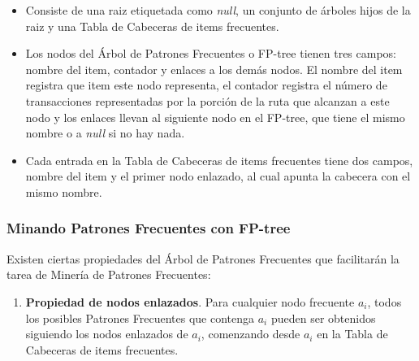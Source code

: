 \begin{itemize}
\item Consiste de una raiz etiquetada como \textit{null}, un conjunto de \'arboles hijos de la raiz y una Tabla de
Cabeceras de items frecuentes.
\item Los nodos del \'Arbol de Patrones Frecuentes o FP-tree tienen tres campos: nombre del item, contador y
enlaces a los dem\'as nodos. El nombre del item registra que item este nodo representa, el contador registra el
n\'umero de transacciones representadas por la porci\'on de la ruta que alcanzan a este nodo y los enlaces llevan
al siguiente nodo en el FP-tree, que tiene el mismo nombre o a \textit{null} si no hay nada.
\item Cada entrada en la Tabla de Cabeceras de items frecuentes tiene dos campos, nombre del item y el primer
nodo enlazado, al cual apunta la cabecera con el mismo nombre.
\end{itemize}

\subsubsection{Minando Patrones Frecuentes con FP-tree}
Existen ciertas propiedades del \'Arbol de Patrones Frecuentes que facilitar\'an la tarea de Miner\'ia de Patrones
Frecuentes:

\begin{enumerate}
\item \textbf{Propiedad de nodos enlazados}. Para cualquier nodo frecuente $a_{i}$, todos los posibles Patrones
Frecuentes que contenga $a_{i}$ pueden ser obtenidos siguiendo los nodos enlazados de $a_{i}$, comenzando desde
$a_{i}$ en la Tabla de Cabeceras de items frecuentes.
\end{enumerate}

